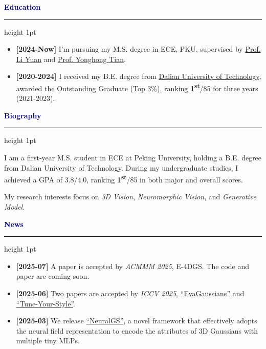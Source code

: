 \documentclass[11pt, a4paper]{article}
\newcommand{\sectioncolor}[1]{\textcolor{darkblue}{#1}}
\newcommand{\cvsection}[1]{
    \vspace{10pt}
    {\Large\bfseries\sectioncolor{#1}}
    \vspace{2pt}
    \hrule height 1pt
    \vspace{8pt}
}
\begin{document}
\begin{minipage}[t]{0.7\textwidth}

\cvsection{Education}

\begin{itemize}[leftmargin=0pt, itemsep=6pt]
    \item \textbf{[2024-Now]}  I'm pursuing my M.S. degree in ECE, PKU, supervised by \href{https://yuanli2333.github.io/}{Prof. Li Yuan} and \href{https://scholar.google.com/citations?user=fn6hJx0AAAAJ&hl=en}{Prof. Yonghong Tian}.
    
    \item \textbf{[2020-2024]}  I received my B.E. degree from \href{https://en.dlut.edu.cn/}{Dalian University of Technology}, awarded the Outstanding Graduate (Top 3\%), ranking \textbf{1\textsuperscript{st}}/85 for three years (2021-2023).
\end{itemize}

\cvsection{Biography}

I am a first-year M.S. student in ECE at Peking University, holding a B.E. degree from Dalian University of Technology. During my undergraduate studies, I achieved a GPA of 3.8/4.0, ranking \textbf{1\textsuperscript{st}}/85 in both major and overall scores.

\vspace{8pt}

 My research interests focus on \textit{3D Vision}, \textit{Neuromorphic Vision}, and \textit{Generative Model}.

\cvsection{News}

\begin{itemize}[leftmargin=0pt, itemsep=4pt]
    \item \textbf{[2025-07]} A paper is accepted by \textit{ACMMM 2025}, E-4DGS. The code and paper are coming soon.
    
    \item \textbf{[2025-06]} Two papers are accepted by \textit{ICCV 2025}, \href{https://arxiv.org/pdf/2405.20224}{``EvaGaussians''} and \href{https://iccv.thecvf.com/virtual/2025/poster/2554}{``Tune-Your-Style''}.
    
    \item \textbf{[2025-03]}  We release \href{https://arxiv.org/pdf/2503.23162}{``NeuralGS''}, a novel framework that effectively adopts the neural field representation to encode the attributes of 3D Gaussians with multiple tiny MLPs.
    

\end{itemize}
\end{minipage}
\end{document}

